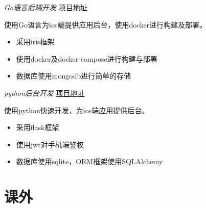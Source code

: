 \documentclass{uniquecv}
\begin{document}
\textit{Go语言后端开发}
\href{https://github.com/colinaaa/hackweek}{项目地址}
\vspace{0.4ex}

使用Go语言为ios端提供应用后台，使用docker进行构建及部署。

\begin{itemize}
  \item 采用iris框架
  \item 使用docker及docker-compose进行构建与部署
  \item 数据库使用mongodb进行简单的存储
\end{itemize}

\textit{python后台开发}
\href{https://github.com/colinaaa/tasks_uniquestudio}{项目地址}

使用python快速开发，为ios端应用提供后台。
\vspace{0.4ex}
\begin{itemize}
		\item 采用flask框架
		\item 使用jwt对手机端鉴权
		\item 数据库使用sqlite，ORM框架使用SQLAlchemy
\end{itemize}

\section{课外}
\end{document}
